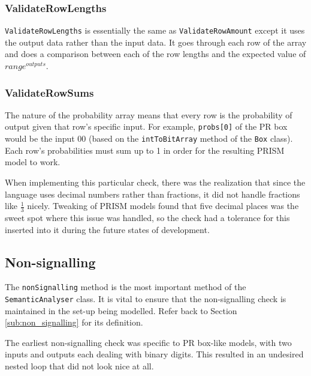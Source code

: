 \documentclass[report.tex]{subfiles}
\begin{document}
\subsubsection{ValidateRowLengths} %
\label{ssub:validaterowlengths}
\texttt{ValidateRowLengths} is essentially the same as 
\texttt{ValidateRowAmount} except it uses the output data rather than the input
data. It goes through each row of the array and does a comparison between each
of the row lengths and the expected value of \(range ^{outputs}\).

\subsubsection{ValidateRowSums} %
\label{ssub:validaterowsums}
The nature of the probability array means that every row is the probability of
output given that row's specific input. For example, \texttt{probs[0]} of the
PR box would be the input 00 (based on the \texttt{intToBitArray} method of the
\texttt{Box} class). Each row's probabilities must sum up to 1 in order for the
resulting PRISM model to work.

When implementing this particular check, there was the realization that since
the language uses decimal numbers rather than fractions, it did not handle
fractions like \(\frac{1}{3}\) nicely. Tweaking of PRISM models found that five
decimal places was the sweet spot where this issue was handled, so the check
had a tolerance for this inserted into it during the future states of
development.

\subsection{Non-signalling} %
\label{sub:non_signalling_impl}
The \texttt{nonSignalling} method is the most important method of the
\texttt{SemanticAnalyser} class. It is vital to ensure that the non-signalling
check is maintained in the set-up being modelled. Refer back to Section
\ref{sub:non_signalling} for its definition.

The earliest non-signalling check was specific to PR box-like models, with two
inputs and outputs each dealing with binary digits. This resulted in an
undesired nested loop that did not look nice at all.


\end{document}
